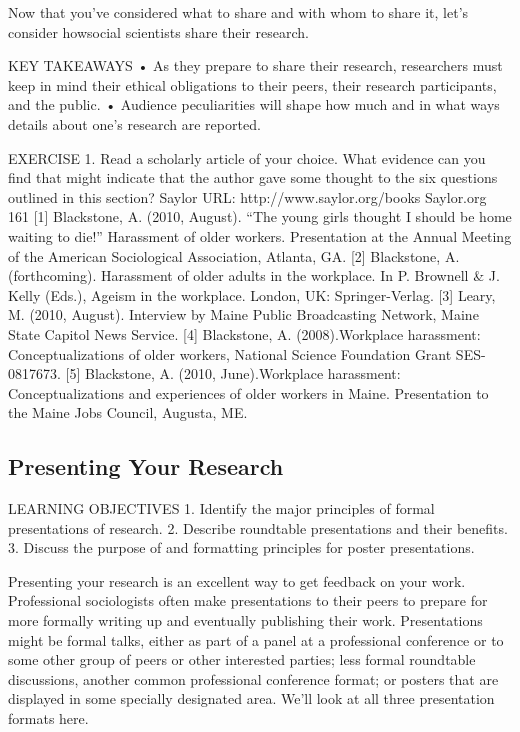 Now that you’ve considered what to share and with whom to share it, let’s consider howsocial scientists share their research.

KEY TAKEAWAYS
• As they prepare to share their research, researchers must keep in mind their ethical obligations to their peers, their research participants, and the public.
• Audience peculiarities will shape how much and in what ways details about one’s research are reported.

EXERCISE
1. Read a scholarly article of your choice. What evidence can you find that might indicate that the author gave some thought to the six questions outlined in this section?
Saylor URL: http://www.saylor.org/books Saylor.org
161
[1] Blackstone, A. (2010, August). “The young girls thought I should be home waiting to die!” Harassment of older workers. Presentation at the Annual Meeting of the American Sociological Association, Atlanta, GA.
[2] Blackstone, A. (forthcoming). Harassment of older adults in the workplace. In P. Brownell \& J. Kelly (Eds.), Ageism in the workplace. London, UK: Springer-Verlag.
[3] Leary, M. (2010, August). Interview by Maine Public Broadcasting Network, Maine State Capitol News Service.
[4] Blackstone, A. (2008).Workplace harassment: Conceptualizations of older workers, National Science Foundation Grant SES-0817673.
[5] Blackstone, A. (2010, June).Workplace harassment: Conceptualizations and experiences of older workers in Maine. Presentation to the Maine Jobs Council, Augusta, ME.

\subsection{Presenting Your Research}

LEARNING OBJECTIVES
1. Identify the major principles of formal presentations of research.
2. Describe roundtable presentations and their benefits.
3. Discuss the purpose of and formatting principles for poster presentations.

Presenting your research is an excellent way to get feedback on your work. Professional sociologists often make presentations to their peers to prepare for more formally writing up and eventually publishing their work. Presentations might be formal talks, either as part of a panel at a professional conference or to some other group of peers or other interested parties; less formal roundtable discussions, another common professional conference format; or posters that are displayed in some specially designated area. We’ll look at all three presentation formats here.

